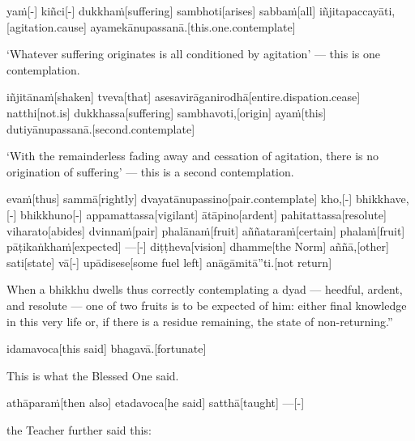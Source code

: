 \begin{samepage}
\begingl[glneveryline={\PaliGlossA,\PaliGlossB}]
yaṁ[-] kiñci[-] dukkhaṁ[suffering] sambhoti[arises] sabbaṁ[all] iñjitapaccayāti,[agitation.cause] ayamekānupassanā.[this.one.contemplate]
\endgl
\nopagebreak
\linespread{0.5}
\begin{spacin}{0.2}
{\PaliGlossFT ‘Whatever suffering originates is all conditioned by agitation’ — this is one contemplation.}
\end{spacin}
\vskip 12pt
\end{samepage}
\begin{samepage}
\begingl[glneveryline={\PaliGlossA,\PaliGlossB}]
iñjitānaṁ[shaken] tveva[that] asesavirāganirodhā[entire.dispation.cease] natthi[not.is] dukkhassa[suffering] sambhavoti,[origin] ayaṁ[this] dutiyānupassanā.[second.contemplate]
\endgl
\nopagebreak
\linespread{0.5}
\begin{spacin}{0.2}
{\PaliGlossFT ‘With the remainderless fading away and cessation of agitation, there is no origination of suffering’ — this is a second contemplation.}
\end{spacin}
\vskip 12pt
\end{samepage}
\begin{samepage}
\begingl[glneveryline={\PaliGlossA,\PaliGlossB}]
evaṁ[thus] sammā[rightly] dvayatānupassino[pair.contemplate] kho,[-] bhikkhave,[-] bhikkhuno[-] appamattassa[vigilant] ātāpino[ardent] pahitattassa[resolute] viharato[abides] dvinnaṁ[pair] phalānaṁ[fruit] aññataraṁ[certain] phalaṁ[fruit] pāṭikaṅkhaṁ[expected] —[-] diṭṭheva[vision] dhamme[the Norm] aññā,[other] sati[state] vā[-] upādisese[some fuel left] anāgāmitā”ti.[not return]
\endgl
\nopagebreak
\linespread{0.5}
\begin{spacin}{0.2}
{\PaliGlossFT When a bhikkhu dwells thus correctly contemplating a dyad — heedful, ardent, and resolute — one of two fruits is to be expected of him: either final knowledge in this very life or, if there is a residue remaining, the state of non-returning.”}
\end{spacin}
\vskip 12pt
\end{samepage}
\begin{samepage}
\begingl[glneveryline={\PaliGlossA,\PaliGlossB}]
idamavoca[this said] bhagavā.[fortunate]
\endgl
\nopagebreak
\linespread{0.5}
\begin{spacin}{0.2}
{\PaliGlossFT This is what the Blessed One said.}
\end{spacin}
\vskip 12pt
\end{samepage}
\begin{samepage}
\begingl[glneveryline={\PaliGlossA,\PaliGlossB}]
athāparaṁ[then also] etadavoca[he said] satthā[taught] —[-]
\endgl
\nopagebreak
\linespread{0.5}
\begin{spacin}{0.2}
{\PaliGlossFT the Teacher further said this:}
\end{spacin}
\vskip 12pt
\end{samepage}
